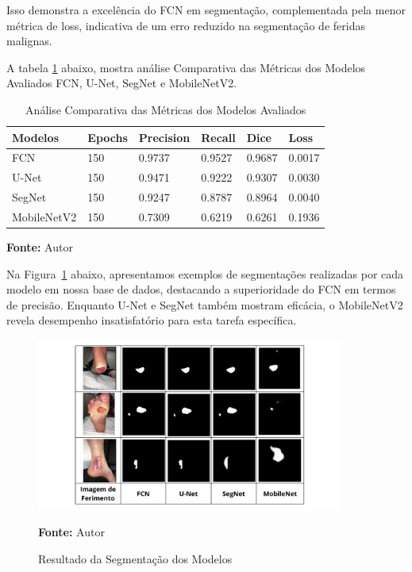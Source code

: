 Isso demonstra a excelência do \ac{FCN} em segmentação, complementada pela menor métrica de loss, indicativa de um erro reduzido na segmentação de feridas malignas.
\clearpage

A tabela \ref{tab:analiseMetricas} abaixo, mostra análise Comparativa das Métricas dos Modelos Avaliados \ac{FCN}, \ac{U-Net}, \ac{SegNet} e \ac{MobileNetV2}.  

\begin{table}[htbp]
    \centering
    \caption{Análise Comparativa das Métricas dos Modelos Avaliados}
    \begin{tabular}{|l|l|l|l|l|l|}
        \hline
        Modelos           & Epochs & Precision & Recall  & Dice    & Loss    \\ \hline
        \ac{FCN}          & 150    & 0.9737    & 0.9527  & 0.9687  & 0.0017  \\ \hline
        \ac{U-Net}        & 150    & 0.9471    & 0.9222  & 0.9307  & 0.0030  \\ \hline
        \ac{SegNet}       & 150    & 0.9247    & 0.8787  & 0.8964  & 0.0040  \\ \hline
        \ac{MobileNetV2}  & 150    & 0.7309    & 0.6219  & 0.6261  & 0.1936  \\ \hline
    \end{tabular}
    \label{tab:analiseMetricas}
    \par\medskip\textbf{Fonte:} Autor
\end{table}


Na Figura~\ref{fig:resultSegmetationModels} abaixo, apresentamos exemplos de segmentações realizadas por cada modelo em nossa base de dados, destacando a superioridade do \ac{FCN} em termos de precisão. Enquanto \ac{U-Net} e \ac{SegNet} também mostram eficácia, o \ac{MobileNetV2} revela desempenho insatisfatório para esta tarefa específica.

\begin{figure}[htbp]
    \centering
    \caption{Resultado da Segmentação dos Modelos}
    \includegraphics[width=0.9\textwidth]{img/resultado_segmentacao_modelos.png}
    \label{fig:resultSegmetationModels}
    \par\medskip\textbf{Fonte:} Autor
\end{figure}



